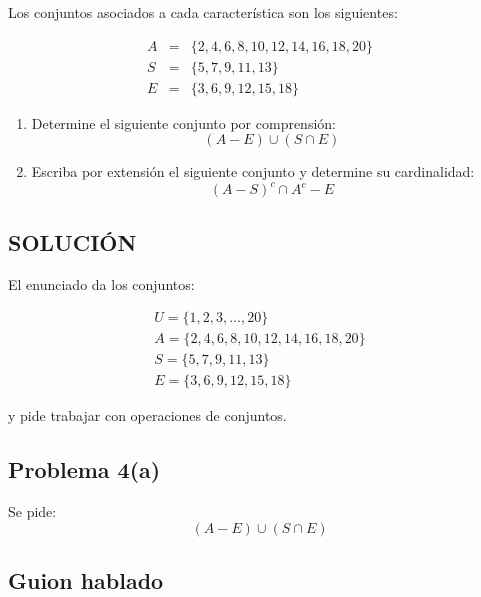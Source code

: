 \documentclass[12pt]{article}
\begin{document}
	Los conjuntos asociados a cada característica son los siguientes:
	
	\[
	\begin{array}{rcl}
		A &=& \{2,4,6,8,10,12,14,16,18,20\} \\
		S &=& \{5,7,9,11,13\} \\
		E &=& \{3,6,9,12,15,18\}
	\end{array}
	\]
	
	\begin{enumerate}[label=\alph*)]
		
		\item Determine el siguiente conjunto por comprensión:
		\[
		(A - E)\cup(S \cap E) 
		\]
		
		\item Escriba por extensión el siguiente conjunto y determine su cardinalidad:
		\[
		(A -S)^c\cap A^c-E
		\]
		
		
	\end{enumerate}
	
	
		\subsection*{\textbf \Large SOLUCIÓN}
		
	El enunciado da los conjuntos:
	
	\[
	\begin{array}{l}
	U=\{1,2,3,\dots,20\} \\[6pt]
	A=\{2,4,6,8,10,12,14,16,18,20\} \\[6pt]
	S=\{5,7,9,11,13\} \\[6pt]
	E=\{3,6,9,12,15,18\}
	\end{array}
	\]
		
	y pide trabajar con operaciones de conjuntos.
	
	\subsection*{Problema 4(a)}
	
	Se pide:
	\[
	(A-E)\cup(S\cap E)
	\]
	
	\subsection*{Guion hablado}
	
\end{document}
